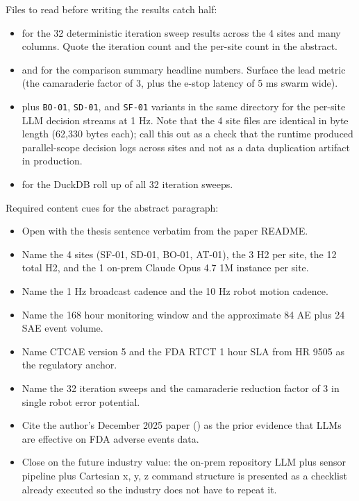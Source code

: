 \begin{sectionaccent}
Files to read before writing the results catch half:
\begin{itemize}
  \item {}
        for the 32 deterministic iteration sweep results across the 4
        sites and many columns. Quote the iteration count and the
        per-site count in the abstract.
  \item {}
        and 
        for the comparison summary headline numbers. Surface the lead
        metric (the camaraderie factor of 3, plus the e-stop latency of
        5 ms swarm wide).
  \item {}
        plus \texttt{BO-01}, \texttt{SD-01}, and \texttt{SF-01} variants
        in the same directory for the per-site LLM decision streams at
        1 Hz. Note that the 4 site files are identical in byte length
        (62,330 bytes each); call this out as a check that the runtime
        produced parallel-scope decision logs across sites and not as a
        data duplication artifact in production.
  \item {}
        for the DuckDB roll up of all 32 iteration sweeps.
\end{itemize}

Required content cues for the abstract paragraph:
\begin{itemize}
  \item Open with the thesis sentence verbatim from the paper README.
  \item Name the 4 sites (SF-01, SD-01, BO-01, AT-01), the 3 H2 per
        site, the 12 total H2, and the 1 on-prem Claude Opus 4.7 1M
        instance per site.
  \item Name the 1 Hz broadcast cadence and the 10 Hz robot motion
        cadence.
  \item Name the 168 hour monitoring window and the approximate 84 AE
        plus 24 SAE event volume.
  \item Name CTCAE version 5 and the FDA RTCT 1 hour SLA from HR 9505
        as the regulatory anchor.
  \item Name the 32 iteration sweeps and the camaraderie reduction
        factor of 3 in single robot error potential.
  \item Cite the author's December 2025 paper
        () as the prior evidence that
        LLMs are effective on FDA adverse events data.
  \item Close on the future industry value: the on-prem repository LLM
        plus sensor pipeline plus Cartesian x, y, z command structure
        is presented as a checklist already executed so the industry
        does not have to repeat it.
\end{itemize}


\end{sectionaccent}
